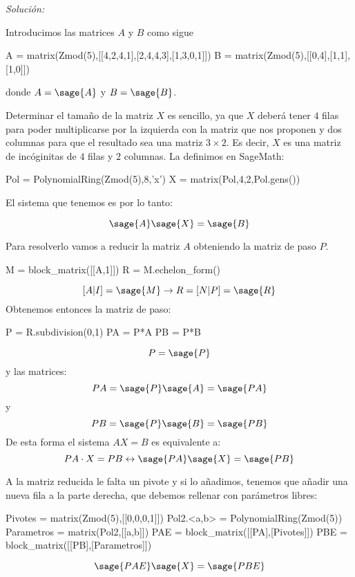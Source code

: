 \documentclass{amsart}
\begin{document}
{\it Solución:} 



Introducimos las matrices $A$ y $B$ como sigue
\begin{sageblock}
A = matrix(Zmod(5),[[4,2,4,1],[2,4,4,3],[1,3,0,1]])
B = matrix(Zmod(5),[[0,4],[1,1],[1,0]])
\end{sageblock}
donde $A=\sage{A}$ y $B=\sage{B}$.

Determinar el tamaño de la matriz $X$ es sencillo, ya que $X$ deberá tener $4$ filas para poder multiplicarse por la izquierda con la matriz que nos proponen
y dos columnas para que el resultado sea una matriz $3 \times 2$. Es decir, $X$ es una matriz de incóginitas de $4$ filas y $2$ columnas. La definimos en SageMath:

\begin{sageblock}
Pol = PolynomialRing(Zmod(5),8,'x')
X = matrix(Pol,4,2,Pol.gens())
\end{sageblock}

El sistema que tenemos es por lo tanto:

$$ \sage{A} \sage{X} = \sage{B}$$

Para resolverlo vamos a reducir la matriz $A$ obteniendo la matriz de paso $P$.

\begin{sageblock}
M = block_matrix([[A,1]])
R = M.echelon_form()
\end{sageblock}
$$ [A|I]=\sage{M} \rightarrow R=[N|P]=\sage{R}$$
Obtenemos entonces la matriz de paso:
\begin{sageblock}
P = R.subdivision(0,1)
PA = P*A
PB = P*B
\end{sageblock}
$$P=\sage{P}$$
y las matrices:
$$PA=\sage{P}\sage{A}=\sage{PA}$$
y
$$PB=\sage{P}\sage{B}=\sage{PB}$$
De esta forma el sistema $AX=B$ es equivalente a:
$$ PA\cdot X= PB \leftrightarrow \sage{PA} \sage{X} = \sage{PB} $$

A la matriz reducida le falta un pivote y si lo añadimos, tenemos que añadir una
nueva fila a la parte derecha, que debemos rellenar con parámetros libres:

\begin{sageblock}
Pivotes = matrix(Zmod(5),[[0,0,0,1]])
Pol2.<a,b> = PolynomialRing(Zmod(5))
Parametros = matrix(Pol2,[[a,b]])
PAE = block_matrix([[PA],[Pivotes]])
PBE = block_matrix([[PB],[Parametros]])
\end{sageblock}

$$ \sage{PAE} \sage{X} = \sage{PBE} $$
\end{document}
